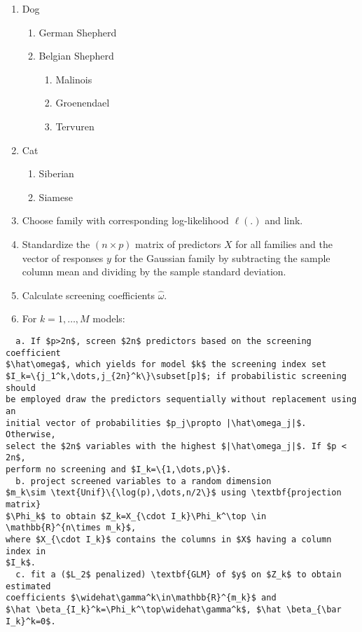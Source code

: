\documentclass[
  article]{jss}
\providecommand{\tightlist}{%
  \setlength{\itemsep}{0pt}\setlength{\parskip}{0pt}}\usepackage{longtable,booktabs,array}
\begin{document}
\begin{enumerate}
\def\labelenumi{\arabic{enumi}.}
\item
  Dog

  \begin{enumerate}
  \def\labelenumii{\arabic{enumii}.}
  \tightlist
  \item
    German Shepherd
  \item
    Belgian Shepherd

    \begin{enumerate}
    \def\labelenumiii{\arabic{enumiii}.}
    \tightlist
    \item
      Malinois
    \item
      Groenendael
    \item
      Tervuren
    \end{enumerate}
  \end{enumerate}
\item
  Cat

  \begin{enumerate}
  \def\labelenumii{\arabic{enumii}.}
  \tightlist
  \item
    Siberian
  \item
    Siamese
  \end{enumerate}
\item
  Choose family with corresponding log-likelihood \(\ell(.)\) and link.
\item
  Standardize the \((n\times p)\) matrix of predictors \(X\) for all
  families and the vector of responses \(y\) for the Gaussian family by
  subtracting the sample column mean and dividing by the sample standard
  deviation.
\item
  Calculate screening coefficients \(\hat\omega\).
\item
  For \(k=1,\dots,M\) models:
\end{enumerate}

\begin{verbatim}
  a. If $p>2n$, screen $2n$ predictors based on the screening coefficient 
$\hat\omega$, which yields for model $k$ the screening index set
$I_k=\{j_1^k,\dots,j_{2n}^k\}\subset[p]$; if probabilistic screening should 
be employed draw the predictors sequentially without replacement using an 
initial vector of probabilities $p_j\propto |\hat\omega_j|$. Otherwise, 
select the $2n$ variables with the highest $|\hat\omega_j|$. If $p < 2n$, 
perform no screening and $I_k=\{1,\dots,p\}$.
  b. project screened variables to a random dimension 
$m_k\sim \text{Unif}\{\log(p),\dots,n/2\}$ using \textbf{projection matrix} 
$\Phi_k$ to obtain $Z_k=X_{\cdot I_k}\Phi_k^\top \in \mathbb{R}^{n\times m_k}$, 
where $X_{\cdot I_k}$ contains the columns in $X$ having a column index in 
$I_k$.
  c. fit a ($L_2$ penalized) \textbf{GLM} of $y$ on $Z_k$ to obtain estimated 
coefficients $\widehat\gamma^k\in\mathbb{R}^{m_k}$ and 
$\hat \beta_{I_k}^k=\Phi_k^\top\widehat\gamma^k$, $\hat \beta_{\bar I_k}^k=0$.
\end{verbatim}
\end{document}
